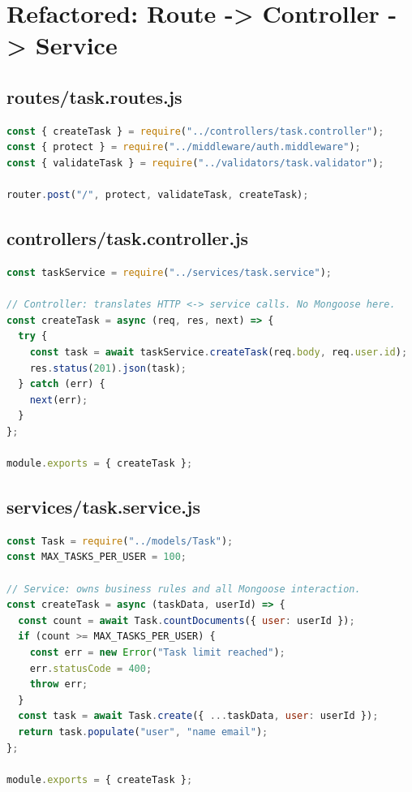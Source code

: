 \section{Refactored: Route -> Controller -> Service}

\subsection{routes/task.routes.js}

\begin{lstlisting}[language=JavaScript]
const { createTask } = require("../controllers/task.controller");
const { protect } = require("../middleware/auth.middleware");
const { validateTask } = require("../validators/task.validator");

router.post("/", protect, validateTask, createTask);
\end{lstlisting}

\subsection{controllers/task.controller.js}

\begin{lstlisting}[language=JavaScript]
const taskService = require("../services/task.service");

// Controller: translates HTTP <-> service calls. No Mongoose here.
const createTask = async (req, res, next) => {
  try {
    const task = await taskService.createTask(req.body, req.user.id);
    res.status(201).json(task);
  } catch (err) {
    next(err);
  }
};

module.exports = { createTask };
\end{lstlisting}

\subsection{services/task.service.js}

\begin{lstlisting}[language=JavaScript]
const Task = require("../models/Task");
const MAX_TASKS_PER_USER = 100;

// Service: owns business rules and all Mongoose interaction.
const createTask = async (taskData, userId) => {
  const count = await Task.countDocuments({ user: userId });
  if (count >= MAX_TASKS_PER_USER) {
    const err = new Error("Task limit reached");
    err.statusCode = 400;
    throw err;
  }
  const task = await Task.create({ ...taskData, user: userId });
  return task.populate("user", "name email");
};

module.exports = { createTask };
\end{lstlisting}

